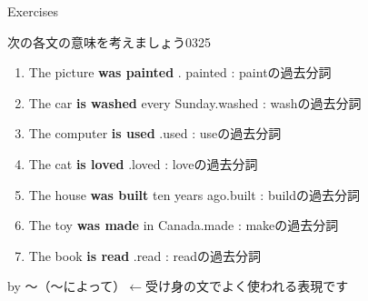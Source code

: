 \documentclass[aspectratio=169,xcolor={dvipsnames,table}]{beamer}
\newcommand{\myaudio}[1]{\href{#1}{\faVolumeUp}}
\begin{document}
\begin{frame}[plain]{Exercises}

  {\small 次の各文の意味を考えましょう}\hfill{\tiny 0325}\,{\scriptsize \myaudio{./audio/051_passive_02.mp3}}

  \begin{enumerate}
    \item The picture \textbf{was painted} .\hfill{}{ \scriptsize painted : paintの過去分詞}
    \item The car \textbf{is washed} every Sunday.\hfill{}{\scriptsize washed : washの過去分詞}
    \item The computer \textbf{is used} .\hfill{}{\scriptsize used  : useの過去分詞}
    \item The cat \textbf{is loved} .\hfill{}{\scriptsize loved  : loveの過去分詞}
    \item The house \textbf{was built} ten years ago.\hfill{}{\scriptsize built  : buildの過去分詞}
    \item The toy \textbf{was made} in Canada.\hfill{}{\scriptsize made  : makeの過去分詞}
    \item The book \textbf{is read} .\hfill{}{\scriptsize read  : readの過去分詞}
  \end{enumerate}

  \hfill{\scriptsize by ～（～によって）$\longleftarrow$受け身の文でよく使われる表現です}


  \\
\end{frame}
\end{document}

